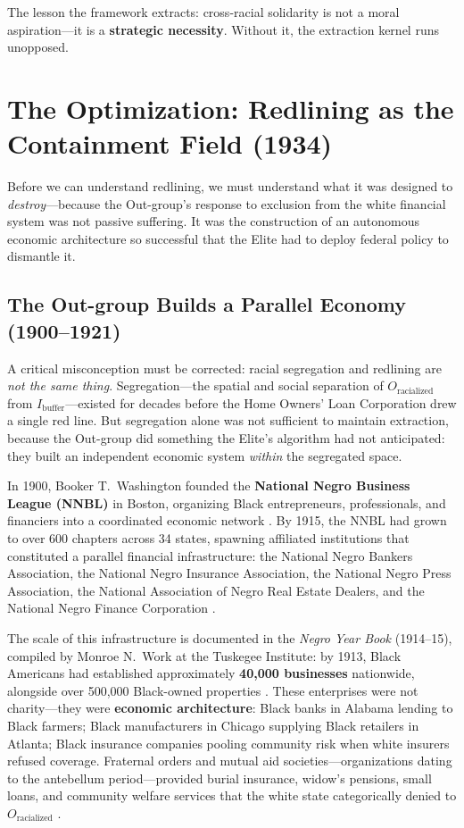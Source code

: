 \documentclass[12pt,openany]{book}
\begin{document}
The lesson the framework extracts: cross-racial solidarity is not a moral aspiration---it is a \textbf{strategic necessity}. Without it, the extraction kernel runs unopposed.

\section{The Optimization: Redlining as the Containment Field (1934)}

Before we can understand redlining, we must understand what it was designed to \textit{destroy}---because the Out-group's response to exclusion from the white financial system was not passive suffering. It was the construction of an autonomous economic architecture so successful that the Elite had to deploy federal policy to dismantle it.

\subsection{The Out-group Builds a Parallel Economy (1900--1921)}

A critical misconception must be corrected: racial segregation and redlining are \textit{not the same thing}. Segregation---the spatial and social separation of $O_{\text{racialized}}$ from $I_{\text{buffer}}$---existed for decades before the Home Owners' Loan Corporation drew a single red line. But segregation alone was not sufficient to maintain extraction, because the Out-group did something the Elite's algorithm had not anticipated: they built an independent economic system \textit{within} the segregated space.

In 1900, Booker T.\ Washington founded the \textbf{National Negro Business League (NNBL)} in Boston, organizing Black entrepreneurs, professionals, and financiers into a coordinated economic network \cite{washington_nnbl}. By 1915, the NNBL had grown to over 600 chapters across 34 states, spawning affiliated institutions that constituted a parallel financial infrastructure: the National Negro Bankers Association, the National Negro Insurance Association, the National Negro Press Association, the National Association of Negro Real Estate Dealers, and the National Negro Finance Corporation \cite{washington_nnbl, work_yearbook}.

The scale of this infrastructure is documented in the \textit{Negro Year Book} (1914--15), compiled by Monroe N.\ Work at the Tuskegee Institute: by 1913, Black Americans had established approximately \textbf{40,000 businesses} nationwide, alongside over 500,000 Black-owned properties \cite{work_yearbook}. These enterprises were not charity---they were \textbf{economic architecture}: Black banks in Alabama lending to Black farmers; Black manufacturers in Chicago supplying Black retailers in Atlanta; Black insurance companies pooling community risk when white insurers refused coverage. Fraternal orders and mutual aid societies---organizations dating to the antebellum period---provided burial insurance, widow's pensions, small loans, and community welfare services that the white state categorically denied to $O_{\text{racialized}}$ \cite{walker_business}.
\end{document}
